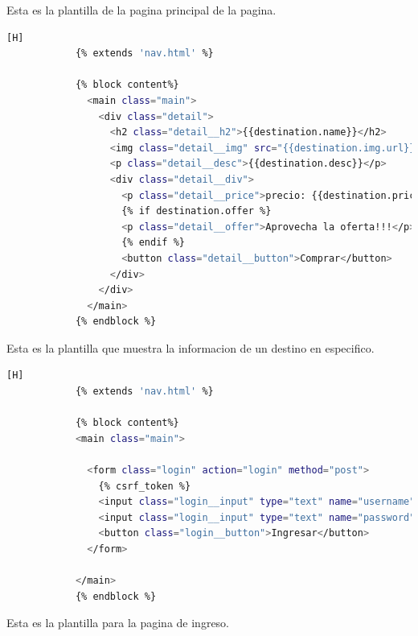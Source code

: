 \documentclass{article}
\begin{document}
            Esta es la plantilla de la pagina principal de la pagina.

            \begin{lstlisting}[language=bash,caption={destination.html}][H]
            {% extends 'nav.html' %}
            
            {% block content%}
              <main class="main">
                <div class="detail">
                  <h2 class="detail__h2">{{destination.name}}</h2>
                  <img class="detail__img" src="{{destination.img.url}}" alt="">
                  <p class="detail__desc">{{destination.desc}}</p>
                  <div class="detail__div">
                    <p class="detail__price">precio: {{destination.price}}.0$</p>
                    {% if destination.offer %}
                    <p class="detail__offer">Aprovecha la oferta!!!</p>
                    {% endif %}
                    <button class="detail__button">Comprar</button>
                  </div>
                </div>
              </main>
            {% endblock %}
	    \end{lstlisting}
 
            Esta es la plantilla que muestra la informacion de un destino en especifico.

            \begin{lstlisting}[language=bash,caption={login.html}][H]
            {% extends 'nav.html' %}
            
            {% block content%}
            <main class="main">
                
              <form class="login" action="login" method="post">
                {% csrf_token %}
                <input class="login__input" type="text" name="username" placeholder="Nombre de Usuario">
                <input class="login__input" type="text" name="password" placeholder="Contraseña">
                <button class="login__button">Ingresar</button>
              </form>
            
            </main>
            {% endblock %}
	\end{lstlisting}
 
            Esta es la plantilla para la pagina de ingreso.
\end{document}
